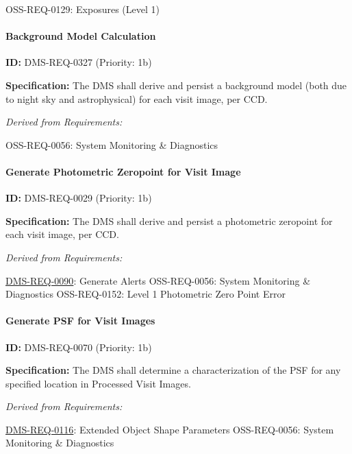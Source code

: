\documentclass[SE,toc,lsstdraft]{lsstdoc}
\begin{document}
OSS-REQ-0129:
Exposures (Level 1) \newline

\paragraph{Background Model Calculation}\hfill  %

\label{DMS-REQ-0327}
\textbf{ID:} DMS-REQ-0327 (Priority: 1b)

\textbf{Specification: }The DMS shall derive and persist a background model (both due to night sky and astrophysical) for each visit image, per CCD.

\emph{Derived from Requirements:}

OSS-REQ-0056:
System Monitoring \& Diagnostics \newline

\paragraph{Generate Photometric Zeropoint for Visit Image}\hfill  %

\label{DMS-REQ-0029}
\textbf{ID:} DMS-REQ-0029 (Priority: 1b)

\textbf{Specification:} The DMS shall derive and persist a photometric zeropoint for each visit image, per CCD.

\emph{Derived from Requirements:}

\hyperref[DMS-REQ-0090]{DMS-REQ-0090}:
Generate Alerts \newline
OSS-REQ-0056:
System Monitoring \& Diagnostics \newline
OSS-REQ-0152:
Level 1 Photometric Zero Point Error \newline

\paragraph{Generate PSF for Visit Images}\hfill  %

\label{DMS-REQ-0070}
\textbf{ID:} DMS-REQ-0070 (Priority: 1b)

\textbf{Specification:} The DMS shall determine a characterization of the PSF for any specified location in Processed Visit Images.

\emph{Derived from Requirements:}

\hyperref[DMS-REQ-0116]{DMS-REQ-0116}:
Extended Object Shape Parameters \newline
OSS-REQ-0056:
System Monitoring \& Diagnostics \newline
\end{document}
